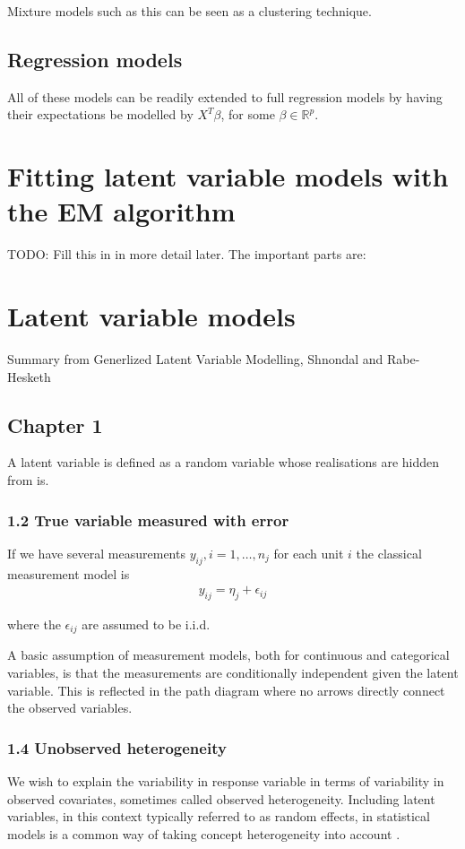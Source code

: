\documentclass{amsart}
\begin{document}
Mixture models such as this can be seen as a clustering technique.

\subsection{Regression models}
All of these models can be readily extended to full regression models by having their
expectations be modelled by $X^T \beta$, for some $\beta \in \mathbb{R}^p$.

\section{Fitting latent variable models with the EM algorithm}
TODO: Fill this in in more detail later. The important parts are:


\section{Latent variable models}
Summary from Generlized Latent Variable Modelling, Shnondal and Rabe-Hesketh
\subsection{Chapter 1}
A latent variable is defined as a random variable whose realisations are hidden from
is.

\subsubsection{1.2 True variable measured with error}
If we have several measurements $y_{ij}, i=1, \ldots, n_j$ for each unit $i$ the 
classical measurement model is
\begin{align*}
	y_{ij} = \eta_j + \epsilon_{ij}
\end{align*}

where the $\epsilon_{ij}$ are assumed to be i.i.d.


A basic assumption of measurement models, both for continuous and categorical
variables, is that the measurements are conditionally independent given the latent
variable. This is reflected in the path diagram where no arrows directly connect
the observed variables.

\subsubsection{1.4 Unobserved heterogeneity}
We wish to explain the variability in response variable in terms of variability in observed covariates, sometimes called observed heterogeneity. Including latent variables, in this context typically referred to as random effects, in statistical models is a common way of taking concept heterogeneity into account .
\end{document}
